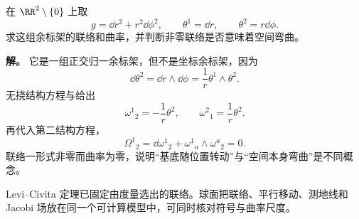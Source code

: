 \begin{exbox}[极坐标中的平坦欧氏平面]
在 $\RR^2\setminus\{0\}$ 上取
\[
g=\dd r^2+r^2\dd\phi^2,
\qquad
\theta^1=\dd r,
\qquad
\theta^2=r\dd\phi.
\]
求这组余标架的联络和曲率，并判断非零联络是否意味着空间弯曲。

\textbf{解。} 它是一组正交归一余标架，但不是坐标余标架，因为
\[
\dd\theta^2
=\dd r\wedge\dd\phi
=\frac1r\theta^1\wedge\theta^2.
\]
无挠结构方程与给出
\[
\omega^1{}_2=-\frac1r\theta^2,
\qquad
\omega^2{}_1=\frac1r\theta^2.
\]
再代入第二结构方程，
\[
\Omega^1{}_2
=\dd\omega^1{}_2
+\omega^1{}_a\wedge\omega^a{}_2=0.
\]
联络一形式非零而曲率为零，说明“基底随位置转动”与“空间本身弯曲”是不同概念。
\end{exbox}


Levi--Civita 定理已固定由度量选出的联络。球面把联络、平行移动、测地线和 Jacobi 场放在同一个可计算模型中，可同时核对符号与曲率尺度。






